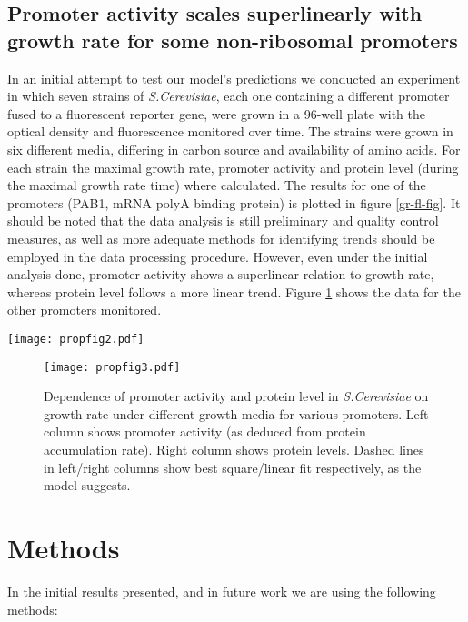 \documentclass[a4page,notitlepage]{article}
\begin{document}
\subsection{Promoter activity scales superlinearly with growth rate for some non-ribosomal promoters}
\label{methods}
In an initial attempt to test our model's predictions we conducted an experiment in which seven strains of \emph{S.Cerevisiae}, each one containing a different promoter fused to a fluorescent reporter gene, were grown in a 96-well plate with the optical density and fluorescence monitored over time.
The strains were grown in six different media, differing in carbon source and availability of amino acids.
For each strain the maximal growth rate, promoter activity and protein level (during the maximal growth rate time) where calculated.
The results for one of the promoters (PAB1, mRNA polyA binding protein) is plotted in figure \ref{gr-fl-fig}.
It should be noted that the data analysis is still preliminary and quality control measures, as well as more adequate methods for identifying trends should be employed in the data processing procedure.
However, even under the initial analysis done, promoter activity shows a superlinear relation to growth rate, whereas protein level follows a more linear trend.
Figure \ref{gr-fl-mult} shows the data for the other promoters monitored.
\begin{SCfigure}
\caption{Dependence of promoter activity and protein level on growth rate for PAB1 (Poly(A) binding protein) promoter under different growth media.
(A) Promoter activity (as deduced by protein accumulation rate) exhibits a superlinear relation to growth rate.
Dashed line shows best square fit, as the model suggests.
(B) Protein level scales roughly like growth rate.
Dashed line shows best linear fit, as the model suggests.
}
\texttt{[image: propfig2.pdf]}
\label{gr-fl-fig}
\end{SCfigure}
\begin{figure}[h]
\texttt{[image: propfig3.pdf]}
\caption{Dependence of promoter activity and protein level in \emph{S.Cerevisiae} on growth rate under different growth media for various promoters.
Left column shows promoter activity (as deduced from protein accumulation rate).
Right column shows protein levels.
Dashed lines in left/right columns show best square/linear fit respectively, as the model suggests.
}
\label{gr-fl-mult}
\end{figure}
\section{Methods}
In the initial results presented, and in future work we are using the following methods:
\end{document}
